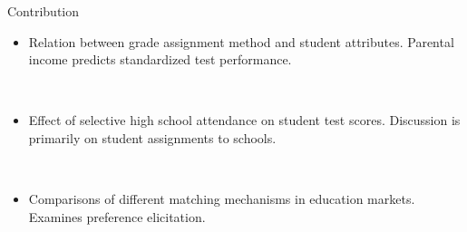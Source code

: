 \begin{frame}{Contribution}
    \begin{itemize}
        \item Relation between grade assignment method and student attributes. Parental income predicts standardized test performance.

        \
        
        \item Effect of selective high school attendance on student test scores. Discussion is primarily on student assignments to schools.

        \

        \item Comparisons of different matching mechanisms in education markets. Examines preference elicitation.
    \end{itemize}
\end{frame}
